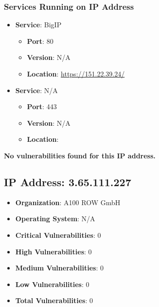 \documentclass{article}
\begin{document}
\subsubsection*{Services Running on IP Address}

\begin{itemize}
    
        \item \textbf{Service}: BigIP
        \begin{itemize}
            \item \textbf{Port}: 80
            \item \textbf{Version}:  N/A 
            \item \textbf{Location}: \href{ https://151.22.39.24/ }{ https://151.22.39.24/ }
        \end{itemize}
    
        \item \textbf{Service}: N/A
        \begin{itemize}
            \item \textbf{Port}: 443
            \item \textbf{Version}:  N/A 
            \item \textbf{Location}: \href{  }{  }
        \end{itemize}
    
\end{itemize}


\textbf{No vulnerabilities found for this IP address.}




\clearpage



\subsection*{IP Address: 3.65.111.227}

\begin{itemize}
    \item \textbf{Organization}: A100 ROW GmbH
    \item \textbf{Operating System}:  N/A 
    \item \textbf{Critical Vulnerabilities}: 0
    \item \textbf{High Vulnerabilities}: 0
    \item \textbf{Medium Vulnerabilities}: 0
    \item \textbf{Low Vulnerabilities}: 0
    \item \textbf{Total Vulnerabilities}: 0
\end{itemize}
\end{document}
